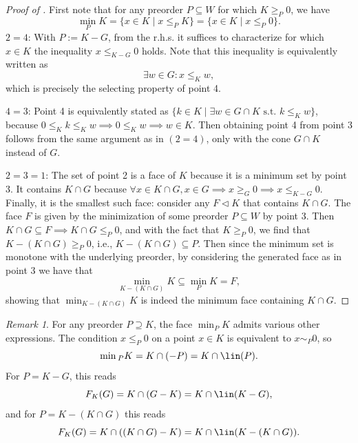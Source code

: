\documentclass{article}
\theoremstyle{plain}
\theoremstyle{definition}
\theoremstyle{remark}
\newtheorem{remark}[remark]{Remark}
\begin{document}
\begin{proof}[\hypertarget{loc:characterization_of_the_generated_face_of_a_convex_cone.proof}{}Proof of ]

First note that for any preorder $P \subseteq W$ for which $K \geq_{P} 0$, we have 
\begin{equation*}
\min_P K = \{x \in K \mid x \le_{P} K\} = \{x \in K \mid x \le_{P} 0\}.
\end{equation*}
$2 = 4$: With $P := K-G$, from the r.h.s. it suffices to characterize for which $x \in K$ the inequality $x \le_{K-G} 0$ holds. Note that this inequality is equivalently written as
\begin{equation*}
\exists w \in G: x \le_{K} w,
\end{equation*}
which is precisely the selecting property of point 4.

$4 = 3$: Point 4 is equivalently stated as $\{k \in K \mid \exists w \in G \cap K \text{ s.t. } k \leq_{K} w\}$, because $0 \le_{K} k \leq_{K} w  \implies 0 \leq_{K} w  \implies w \in K$. Then obtaining point 4 from point 3 follows from the same argument as in $(2 = 4)$, only with the cone $G \cap K$ instead of $G$.

$2 = 3 = 1$: The set of point 2 is a face of $K$ because it is a minimum set by  point 3. It contains $K \cap G$ because $\forall x \in K \cap G, x  \in G  \implies x \geq_{G} 0  \implies x \leq_{K-G} 0$. Finally, it is the smallest such face: consider any $F \triangleleft K$ that contains $K \cap G$. The face $F$ is given by the minimization of some preorder $P \subseteq W$ by  point 3. Then $K \cap G \subseteq F  \implies K \cap G \leq_{P} 0$, and with the fact that $K \geq_{P} 0$, we find that $K - (K \cap G) \geq_{P} 0$, i.e., $K - (K \cap G) \subseteq P$. Then since the minimum set is monotone with the underlying preorder,  by considering the generated face as in point 3 we have that
\begin{equation*}
\min_{K - (K \cap G)} K \subseteq \min_P K = F,
\end{equation*}
showing that $\min_{K - (K \cap G)} K$ is indeed the minimum face containing $K \cap G$.
\end{proof}
\begin{remark}
\label{loc:characterization_of_the_generated_face_of_a_convex_cone.remark}
For any preorder $P \supseteq K$, the face $\min_P K$ admits various other expressions. The condition $x \le_{P} 0$ on a point $x \in K$ is equivalent to $x \sim_{P} 0$, so
\begin{equation*}
\min{}_P K = K \cap (-P) = K \cap \lin(P).
\end{equation*}
For $P = K-G$, this reads 
\begin{equation*}
F_K(G) = K \cap (G-K) = K \cap \lin(K-G),
\end{equation*}
 and for $P = K - (K\cap G)$ this reads 
\begin{equation*}
F_K(G) = K \cap ((K \cap G)-K) = K \cap \lin(K- (K \cap G)).
\end{equation*}
\end{remark}
\end{document}
